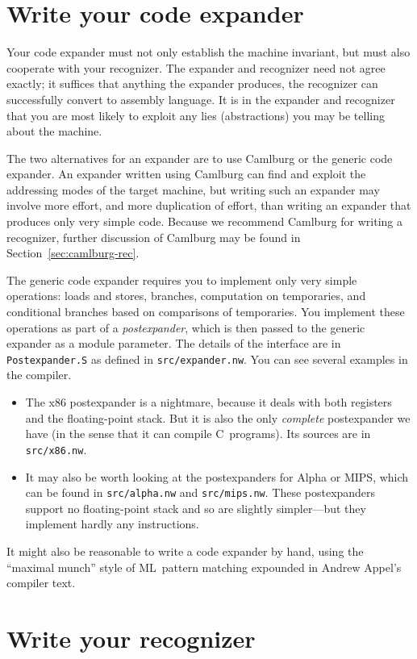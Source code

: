 \documentclass[12pt]{article}
\begin{document}
\section{Write your code expander}

Your code expander must not only establish the machine invariant, but
must also cooperate with your recognizer.
The expander and recognizer need not agree exactly;
it suffices that anything the expander produces, the recognizer can
successfully convert to assembly language.
It is in the expander and recognizer that you are most likely to
exploit any lies (abstractions) you may be telling about the machine.

The two alternatives for an expander are to use Camlburg or the
generic code expander.
An expander written using Camlburg can find and exploit the
addressing modes of the target machine, but writing such an expander
may involve more effort, and more duplication of effort, than writing
an expander that produces only very simple code.
Because we recommend Camlburg for writing a recognizer, further
discussion of Camlburg may be found in Section~\ref{sec:camlburg-rec}.

The generic code expander requires you to implement only very simple
operations: loads and stores, branches, computation on temporaries, and
conditional branches based on comparisons of temporaries.
You implement these operations as part of a \emph{postexpander}, which
is then passed to the generic expander as a module parameter.
The details of the interface are in \texttt{Postexpander.S} as
defined in \texttt{src/expander.nw}.
You can see several examples in the compiler.
\begin{itemize}
\item
The x86 postexpander is a nightmare, because it deals with both
registers and the floating-point stack.
But it is also the only \emph{complete} postexpander we have (in the
sense that it can compile C~programs).
Its sources are in \texttt{src/x86.nw}.
\item
It may also be worth looking at the postexpanders for Alpha or MIPS,
which can be found in \texttt{src/alpha.nw} and \texttt{src/mips.nw}.
These postexpanders support no floating-point stack and so are
slightly simpler---but they implement hardly any instructions.
\end{itemize}
It might also be reasonable to write a code expander by hand, using
the ``maximal munch'' style of ML~pattern matching expounded in Andrew
Appel's compiler text.

\section{Write your recognizer}
\end{document}
